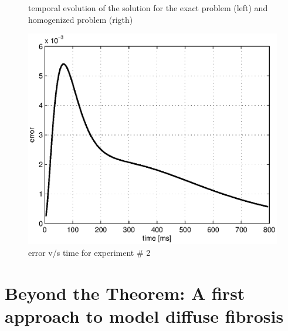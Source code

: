 \begin{figure}[H]
\centering
{} 
\caption{temporal evolution of the solution for the exact problem (left) and homogenized problem (rigth)}\label{fig:verification-r2ex2}
\end{figure}

\begin{figure}[H]
\centering
\includegraphics[height = 6 cm]{fig/theorem_verification_r2_exp2_error}
\caption{error v/s time for experiment \# 2}\label{fig:error_diff_r2_ex2}
\end{figure}

\newpage
\section{Beyond the Theorem: A first approach to model diffuse fibrosis}

